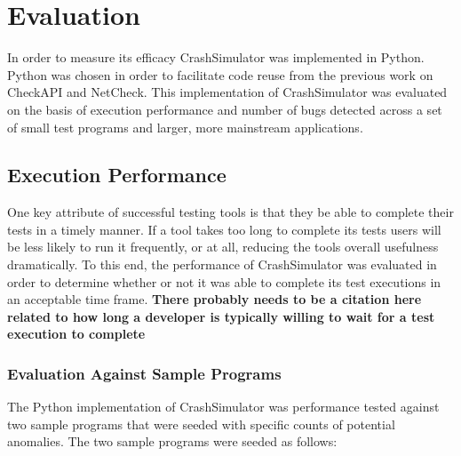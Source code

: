

\section{Evaluation}

    In order to measure its efficacy CrashSimulator was implemented in Python. Python was chosen in order to facilitate
    code reuse from the previous work on CheckAPI and NetCheck. This implementation of CrashSimulator was evaluated on
    the basis of execution performance and number of bugs detected across a set of small test programs and larger, more
    mainstream applications.

    \subsection{Execution Performance}

        One key attribute of successful testing tools is that they be able to complete their tests in a timely manner.
        If a tool takes too long to complete its tests users will be less likely to run it frequently, or at all,
        reducing the tools overall usefulness dramatically. To this end, the performance of CrashSimulator was evaluated
        in order to determine whether or not it was able to complete its test executions in an acceptable time frame.
        \textbf{There probably needs to be a citation here related to how long a developer is typically willing to wait
        for a test execution to complete}

        \subsubsection{Evaluation Against Sample Programs}

            The Python implementation of CrashSimulator was performance
            tested against two sample programs that were seeded with specific counts of potential anomalies. The two sample
            programs were seeded as follows:

